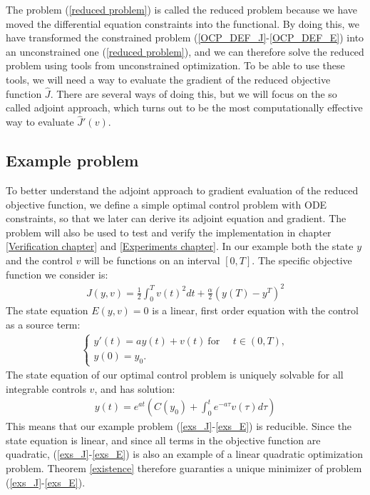 \noindent
The problem (\ref{reduced problem}) is called the reduced problem because we have moved the differential equation constraints into the functional. By doing this, we have transformed the constrained problem (\ref{OCP_DEF_J}-\ref{OCP_DEF_E}) into an unconstrained one (\ref{reduced problem}), and we can therefore solve the reduced problem using tools from unconstrained optimization. To be able to use these tools, we will need a way to evaluate the gradient of the reduced objective function $\hat J$. There are several ways of doing this, but we will focus on the so called adjoint approach, which turns out to be the most computationally effective way to evaluate $\hat J'(v)$.  
\subsection{Example problem} \label{example_sec}
To better understand the adjoint approach to gradient evaluation of the reduced objective function, we define a simple optimal control problem with ODE constraints, so that we later can derive its adjoint equation and gradient. The problem will also be used to test and verify the implementation in chapter \ref{Verification chapter} and \ref{Experiments chapter}. In our example both the state $y$ and the control $v$ will be functions on an interval $[0,T]$. The specific objective function we consider is:
\begin{align}
J(y,v) = \frac{1}{2}\int_0^Tv(t)^2dt + \frac{\alpha}{2}(y(T)-y^T)^2 \label{exs_J}
\end{align}
The state equation $E(y,v)=0$ is a linear, first order equation with the control as a source term:
\begin{align}
\left\{
     \begin{array}{lr}
       	y'(t)=ay(t) + v(t) \ \textrm{for } \quad t\in(0,T),\\
       	y(0)=y_0.
     \end{array}
   \right. \label{exs_E}
\end{align}
The state equation of our optimal control problem is uniquely solvable for all integrable controls $v$, and has solution:
\begin{align*}
y(t) = e^{a t}(C(y_0)+\int_0^te^{-a\tau}v(\tau)d\tau)
\end{align*}
This means that our example problem (\ref{exs_J}-\ref{exs_E}) is reducible. Since the state equation is linear, and since all terms in the objective function are quadratic, (\ref{exs_J}-\ref{exs_E}) is also an example of a linear quadratic optimization problem. Theorem \ref{existence} therefore guaranties a unique minimizer of problem (\ref{exs_J}-\ref{exs_E}).
